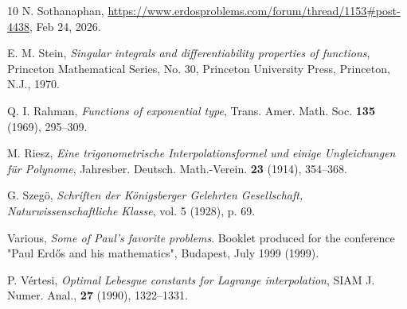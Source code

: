 \documentclass[12pt]{amsart}
\begin{document}
\begin{thebibliography}{10}
N. Sothanaphan, \url{https://www.erdosproblems.com/forum/thread/1153#post-4438}, Feb 24, 2026.

E. M. Stein, \emph{Singular integrals and differentiability properties of functions}, Princeton Mathematical Series, No. 30, Princeton University Press, Princeton, N.J., 1970.

Q. I. Rahman, \emph{Functions of exponential type}, Trans. Amer. Math. Soc. \textbf{135} (1969), 295--309.

M. Riesz, \emph{Eine trigonometrische Interpolationsformel und einige Ungleichungen f\"ur Polynome}, Jahresber. Deutsch. Math.-Verein. \textbf{23} (1914), 354--368.

G. Szeg\"o, \emph{Schriften der Königsberger Gelehrten Gesellschaft, Naturwissenschaftliche Klasse}, vol. 5 (1928), p. 69.

Various, \emph{Some of Paul's favorite problems}. Booklet produced for the conference "Paul Erd\H{o}s and his mathematics", Budapest, July 1999 (1999).

P. V\'ertesi, \emph{Optimal Lebesgue constants for Lagrange interpolation}, SIAM J. Numer. Anal., \textbf{27} (1990), 1322--1331.

\end{thebibliography}
\end{document}
